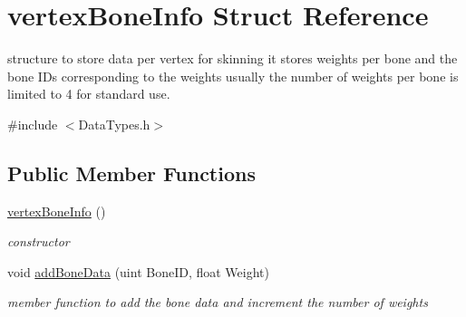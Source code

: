 \hypertarget{structvertex_bone_info}{\section{vertex\-Bone\-Info Struct Reference}
\label{structvertex_bone_info}
}


structure to store data per vertex for skinning it stores weights per bone and the bone I\-Ds corresponding to the weights usually the number of weights per bone is limited to 4 for standard use.  




{\ttfamily \#include $<$Data\-Types.\-h$>$}

\subsection*{Public Member Functions}
\begin{DoxyCompactItemize}
\item 
\hyperlink{structvertex_bone_info_a0b21f08b5c3ef7e6098932c9099b520f}{vertex\-Bone\-Info} ()
\begin{DoxyCompactList}\small\item\em constructor \end{DoxyCompactList}\item 
void \hyperlink{structvertex_bone_info_a93393e0435ba8efb0927ac10e1bc29e0}{add\-Bone\-Data} (uint Bone\-I\-D, float Weight)
\begin{DoxyCompactList}\small\item\em member function to add the bone data and increment the number of weights \end{DoxyCompactList}\end{DoxyCompactItemize}
